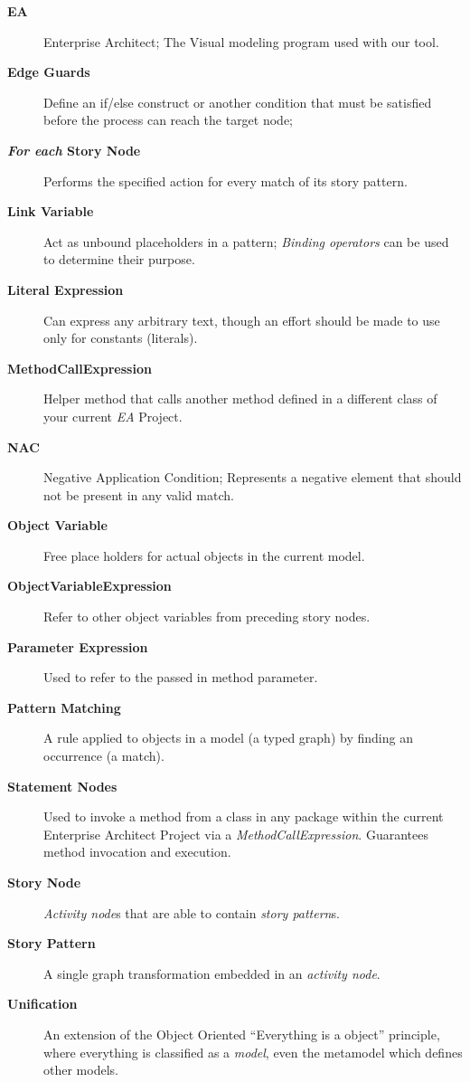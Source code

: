 \begin{description}
\item[\bf EA]
Enterprise Architect; The Visual modeling program used with our tool.

\item[\bf Edge Guards]
Define an if/else construct or another condition that must be satisfied before the process can reach the target node;

\item[\bf \emph{For each} Story Node]
Performs the specified action for every match of its story pattern.

\item[\bf Link Variable]
Act as unbound placeholders in a pattern; \emph{Binding operators} can be used to determine their purpose.

\item[\bf Literal Expression]
Can express any arbitrary text, though an effort should be made to use only for constants (literals).

\item[\bf MethodCallExpression]
Helper method that calls another method defined in a different class of your current \emph{EA} Project.

\item[\bf NAC]
Negative Application Condition; Represents a negative element that should not be present in any valid match.

\item[\bf Object Variable]
Free place holders for actual objects in the current model.

\item[\bf ObjectVariableExpression]
Refer to other object variables from preceding story nodes.

\item[\bf Parameter Expression]
Used to refer to the passed in method parameter.

\item[\bf Pattern Matching]
A rule applied to objects in a model (a typed graph) by finding an occurrence (a match). 

\item[\bf Statement Nodes]
Used to invoke a method from a class in any package within the current Enterprise Architect Project via a \emph{MethodCallExpression}. Guarantees method
invocation and execution.

\item[\bf Story Node]
\emph{Activity node}s that are able to contain \emph{story pattern}s.

\item[\bf Story Pattern]
A single graph transformation embedded in an \emph{activity node}.

\item[\bf Unification]
An extension of the Object Oriented ``Everything is a object'' principle, where everything is classified as a \emph{model}, even the metamodel which defines
other models.
\end{description}